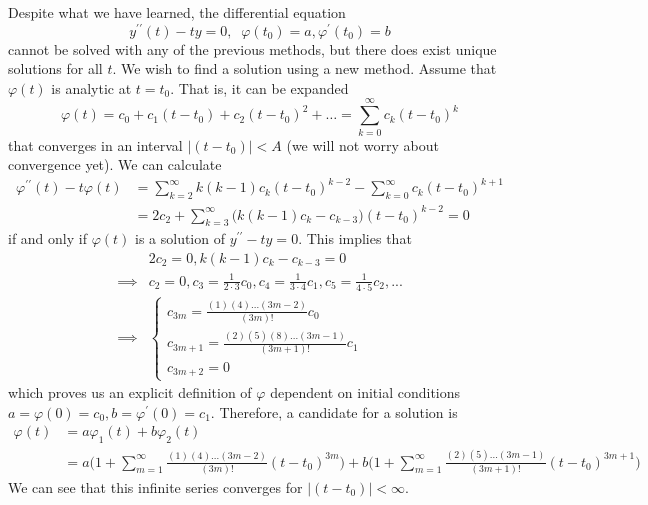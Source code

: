 \documentclass{article}
\newcounter{definition}[section]
\newcounter{example}[section]
\begin{document}
    \begin{example}
      \label{ex:airys-equation-has-no-elementary-solution}
    Despite what we have learned, the differential equation 
    \begin{equation}
      y^{\prime\prime} (t) - t y = 0, \;\; \varphi(t_0) = a, \varphi^\prime (t_0) = b
    \end{equation}
    cannot be solved with any of the previous methods, but there does exist unique solutions for all $t$. We wish to find a solution using a new method. Assume that $\varphi(t)$ is analytic at $t= t_0$. That is, it can be expanded
    \begin{equation}
      \varphi(t) = c_0 + c_1 (t-t_0) + c_2 (t-t_0)^2 + \ldots = \sum_{k=0}^\infty c_k (t-t_0)^k
    \end{equation}
    that converges in an interval $|(t-t_0)| < A$ (we will not worry about convergence yet). We can calculate
    \begin{align*}
        \varphi^{\prime\prime} (t) - t \varphi(t) & = \sum_{k=2}^\infty k(k-1) c_k (t-t_0)^{k-2} - \sum_{k=0}^\infty c_k (t-t_0)^{k+1} \\
        & = 2 c_2 + \sum_{k=3}^\infty \big( k(k-1) c_k - c_{k-3}\big) (t-t_0)^{k-2} = 0
    \end{align*}
    if and only if $\varphi(t)$ is a solution of $y^{\prime\prime} - t y = 0$. This implies that 
    \begin{align*}
        & 2 c_2 = 0, k(k-1) c_k - c_{k-3} = 0 \\
        \implies & c_2 = 0, c_3 = \frac{1}{2 \cdot 3} c_0, c_4 = \frac{1}{3 \cdot 4} c_1, c_5 = \frac{1}{4 \cdot 5} c_2, ... \\
        \implies & \begin{cases}
        c_{3m} = \frac{(1)(4)...(3m-2)}{(3m)!} c_0 \\
        c_{3m+1} = \frac{(2)(5)(8)...(3m-1)}{(3m+1)!} c_1 \\
        c_{3m+2} = 0
        \end{cases}
    \end{align*}
    which proves us an explicit definition of $\varphi$ dependent on initial conditions $a = \varphi(0) = c_0, b = \varphi^\prime (0) = c_1$. Therefore, a candidate for a solution is
    \begin{align*}
        \varphi(t) & = a \varphi_1 (t) + b \varphi_2 (t) \\
        & = a \bigg( 1 + \sum_{m=1}^\infty \frac{(1)(4)...(3m-2)}{(3m)!} (t-t_0)^{3m} \bigg) + b \bigg( 1 + \sum_{m=1}^\infty \frac{(2)(5)...(3m-1)}{(3m+1)!} (t-t_0)^{3m+1} \bigg)
    \end{align*}
    We can see that this infinite series converges for $|(t-t_0)| < \infty$. 
    \end{example}
\end{document}
